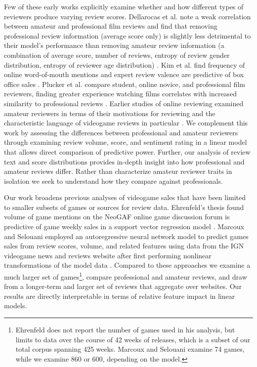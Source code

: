 \documentclass{sig-alternate}
\begin{document}
Few of these early works explicitly examine whether and how different types of reviewers produce varying review scores. 
Dellarocas et al. note a weak correlation between amateur and professional film reviews and find that removing professional review information (average score only) is slightly less detrimental to their model's performance than removing amateur review information (a combination of average score, number of reviews, entropy of review gender distribution, entropy of reviewer age distribution) \cite{dellarocas2007exploring}. 
Kim et al. find frequency of online word-of-mouth mentions and expert review valence are predictive of box office sales \cite{kim2013moviewom}.
Plucker et al. compare student, online novice, and professional film reviewers, finding greater experience watching films correlates with increased similarity to professional reviews \cite{plucker2009pro-novice-eval}. 
Earlier studies of online reviewing examined amateur reviewers in terms of their motivations for reviewing \cite{gilbert2010deja, diakopoulos2011news-discourse, xu2012critique} and the characteristic language of videogame reviews in particular \cite{zagal2011natural}. We complement this work by assessing the differences between professional and amateur reviewers through examining review volume, score, and sentiment rating in a linear model that allows direct comparison of predictive power. Further, our analysis of review text and score distributions provides in-depth insight into how professional and amateur reviews differ. Rather than characterize amateur reviewer traits in isolation we seek to understand how they compare against professionals.

Our work broadens previous analyses of videogame sales that have been limited to smaller subsets of games or sources for review data. Ehrenfeld's thesis found volume of game mentions on the NeoGAF online game discussion forum is predictive of game weekly sales in a support vector regression model \cite{ehrenfeld2011predicting}. Marcoux and Selouani employed an autoregressive neural network model to predict games sales from review scores, volume, and related features using data from the IGN videogame news and reviews website after first performing nonlinear transformations of the model data \cite{marcoux2009hybrid}.
Compared to these approaches we examine a much larger set of
games\footnote{Ehrenfeld does not report the number of games used in his
analysis, but limits to data over the course of 42 weeks of releases,
which is a subset of our total corpus spanning 425 weeks. Marcoux and
Selouani examine 74 games, while we examine 860 or 600, depending on the
model.},
compare professional and amateur reviews, and draw from a longer-term and larger set of reviews that aggregate over websites. Our results are directly interpretable in terms of relative feature impact in linear models.
\end{document}
